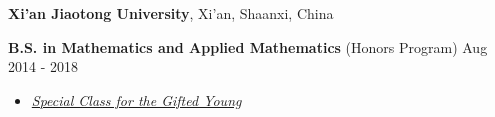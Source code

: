 \documentclass[margin,line]{res}
\newenvironment{list1}{
  \begin{list}{\ding{113}}{%
      \setlength{\itemsep}{0in}
      \setlength{\parsep}{0in} \setlength{\parskip}{0in}
      \setlength{\topsep}{0in} \setlength{\partopsep}{0in} 
      \setlength{\leftmargin}{0.17in}}}{\end{list}}
\begin{document}
\begin{resume}
{\bf Xi'an Jiaotong University}, Xi'an, Shaanxi, China\\
\vspace*{-.15in}
\begin{list1}
\item[] \textbf{B.S. in Mathematics and Applied Mathematics} (Honors Program) 
\hfill Aug 2014 - 2018
\end{list1}
\begin{itemize}
\setlength\itemsep{0.1em}
\item[] \href{https://en.wikipedia.org/wiki/Special_Class_for_the_Gifted_Young#Xi'an_Jiaotong_University}{\textit{Special Class for the Gifted Young}}
\end{itemize}

\iffalse
{\bf Columbia University in the City of New York}, New York City, NY, USA\\
\vspace*{-.15in}
\begin{list1}
\item[] Visiting Undergraduate Student \hfill Jan. - May 2016
\end{list1}

{\bf University of California, Berkeley}, Berkeley, CA, USA\\
\vspace*{-.15in}
\begin{list1}
\item[]  Visiting Undergraduate Student \hfill Jan. - May 2017
\end{list1}

\fi








\end{resume}
\end{document}
